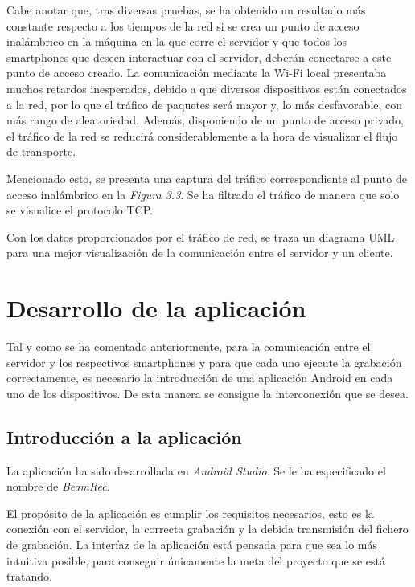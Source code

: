 \documentclass[a4paper,11pt]{book}
\begin{document}
			Cabe anotar que, tras diversas pruebas, se ha obtenido un resultado más constante respecto a los tiempos de la red si se crea un punto de acceso inalámbrico en la máquina en la que corre el servidor y que todos los smartphones que deseen interactuar con el servidor, deberán conectarse a este punto de acceso creado. La comunicación mediante la Wi-Fi local presentaba muchos retardos inesperados, debido a que diversos dispositivos están conectados a la red, por lo que el tráfico de paquetes será mayor y, lo más desfavorable, con más rango de aleatoriedad.
			Además, disponiendo de un punto de acceso privado, el tráfico de la red se reducirá considerablemente a la hora de visualizar el flujo de transporte.
			
			Mencionado esto, se presenta una captura del tráfico correspondiente al punto de acceso inalámbrico en la \textit{Figura 3.3}. Se ha filtrado el tráfico de manera que solo se visualice el protocolo TCP.
			
			
			
			
		
			Con los datos proporcionados por el tráfico de red, se traza un diagrama UML para una mejor visualización de la comunicación entre el servidor y un cliente.
			
			
			
			
\chapter{Desarrollo de la aplicación }

Tal y como se ha comentado anteriormente, para la comunicación entre el servidor y los respectivos smartphones y para que cada uno ejecute la grabación correctamente, es necesario la introducción de una aplicación Android en cada uno de los dispositivos. De esta manera se consigue la interconexión que se desea.

	\section{Introducción a la aplicación}
	La aplicación ha sido desarrollada en \textit{Android Studio}. Se le ha especificado el nombre de \textit{BeamRec}.
	
	El propósito de la aplicación es cumplir los requisitos necesarios, esto es la conexión con el servidor, la correcta grabación y la debida transmisión del fichero de grabación. La interfaz de la aplicación está pensada para que sea lo más intuitiva posible, para conseguir únicamente la meta del proyecto que se está tratando.
	
\end{document}
